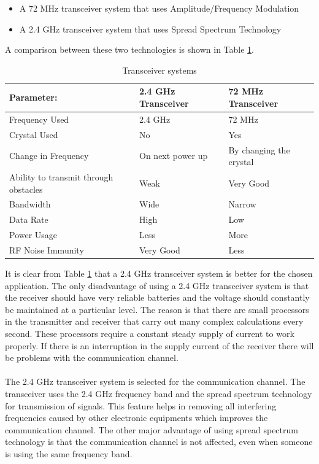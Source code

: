\begin{itemize}
\item A 72 MHz transceiver system that uses Amplitude/Frequency Modulation
\item A 2.4 GHz transceiver system that uses Spread Spectrum Technology
\end{itemize}

\noindent
A comparison between these two technologies is shown in Table \ref{tab:transceiver}.

\begin{center}
\begin{table}[bht]
\caption{Transceiver systems}
\begin{tabular}{|l l l|}
\hline
\textbf{Parameter:} &  \textbf{2.4 GHz Transceiver} & \textbf{72 MHz Transceiver}\\ 
\hline
Frequency Used & 2.4 GHz & 72 MHz \\
Crystal Used & No & Yes \\
Change in Frequency & On next power up & By changing the crystal \\
Ability to transmit through obstacles & Weak & Very Good\\
Bandwidth & Wide & Narrow\\
Data Rate & High & Low\\
Power Usage & Less & More\\
RF Noise Immunity & Very Good & Less \\
\hline
\end{tabular}
\label{tab:transceiver}
\end{table}
\vspace{-2.0em}
\end{center}

\noindent
It is clear from Table \ref{tab:transceiver} that a 2.4 GHz transceiver system is better for the chosen application. The only disadvantage of using a 2.4 GHz transceiver system is that the receiver should have very reliable batteries and the voltage should constantly be maintained at a particular level. The reason is that there are small processors in the transmitter and receiver that carry out many complex calculations every second. These processors require a constant steady supply of current to work properly. If there is an interruption in the supply current of the receiver there will be problems with the communication channel.
\\
\\
The 2.4 GHz transceiver system is selected for the communication channel. The transceiver uses the 2.4 GHz frequency band and the spread spectrum technology for transmission of signals. This feature helps in removing all interfering frequencies caused by other electronic equipments which improves the communication channel. The other major advantage of using spread spectrum technology is that the communication channel is not affected, even when someone is using the same frequency band.


